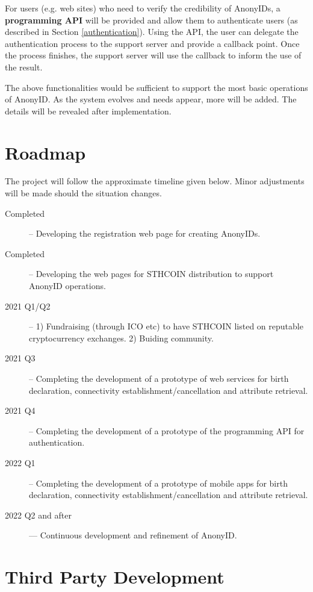 \documentclass[12pt, a4paper]{article}
\begin{document}
For users (e.g. web sites) who need to verify the credibility of AnonyIDs, a \textbf{programming API} will be provided and allow them to authenticate users (as described in Section \ref{authentication}). Using the API, the user can delegate the authentication process to the support server and provide a callback point. Once the process finishes, the support server will use the callback to inform the use of the result.

The above functionalities would be sufficient to support the most basic operations of AnonyID. As the system evolves and needs appear, more will be added. The details will be revealed after implementation.

\section{Roadmap}

The project will follow the approximate timeline given below. Minor adjustments will be made should the situation changes.

\begin{description}
\item[Completed] -- Developing the registration web page for creating AnonyIDs.
\item[Completed] -- Developing the web pages for STHCOIN distribution to support AnonyID operations.
\item[2021 Q1/Q2] -- 1) Fundraising (through ICO etc) to have STHCOIN listed on reputable cryptocurrency exchanges. 2) Buiding community.
\item[2021 Q3] -- Completing the development of a prototype of web services for birth declaration, connectivity establishment/cancellation and attribute retrieval. 
\item[2021 Q4] -- Completing the development of a prototype of the programming API for authentication.
\item[2022 Q1] -- Completing the development of a prototype of mobile apps for birth declaration, connectivity establishment/cancellation and attribute retrieval. 
\item[2022 Q2 and after] --- Continuous development and refinement of AnonyID.
\end{description}

\section{Third Party Development}
\end{document}
